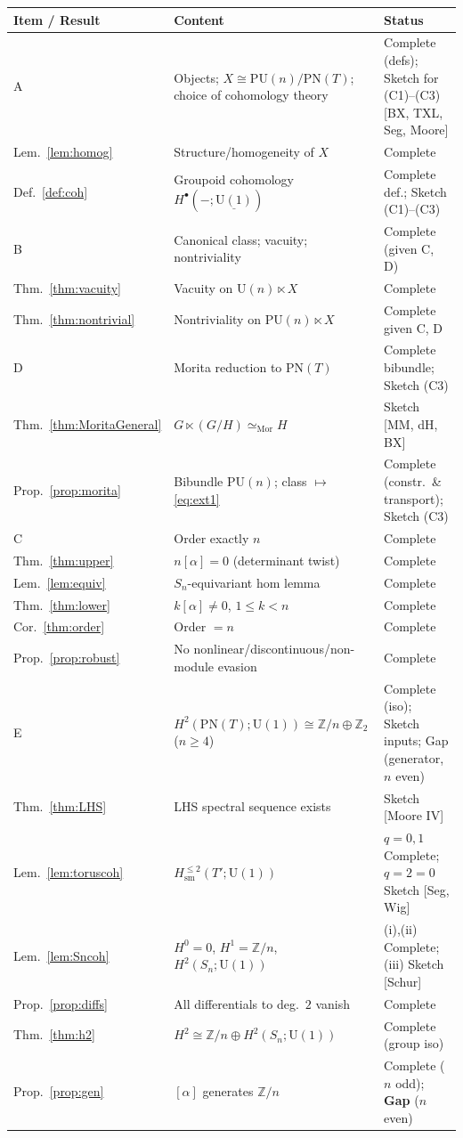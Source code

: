 \documentclass[11pt]{article}
\theoremstyle{definition}
\newcommand{\U}{\mathrm{U}}
\newcommand{\PU}{\mathrm{PU}}
\newcommand{\PN}{\mathrm{PN}}
\newcommand{\Z}{\mathbb{Z}}
\newcommand{\Tp}{T'}
\newcommand{\sm}{\mathrm{sm}}
\begin{document}
\begin{center}
\small
\begin{tabular}{@{}p{}p{}p{}@{}}
\toprule
\textbf{Item / Result} & \textbf{Content} & \textbf{Status} \\
\midrule
A & Objects; $X\cong\PU(n)/\PN(T)$; choice of cohomology theory & Complete (defs);
Sketch for (C1)--(C3) [BX, TXL, Seg, Moore] \\
\;Lem.~\ref{lem:homog} & Structure/homogeneity of $X$ & Complete \\
\;Def.~\ref{def:coh} & Groupoid cohomology $H^\bullet(-;\underline{\U(1)})$ & Complete def.;
Sketch (C1)--(C3) \\
\midrule
B & Canonical class; vacuity; nontriviality & Complete (given C, D) \\
\;Thm.~\ref{thm:vacuity} & Vacuity on $\U(n)\ltimes X$ & Complete \\
\;Thm.~\ref{thm:nontrivial} & Nontriviality on $\PU(n)\ltimes X$ & Complete given C, D \\
\midrule
D & Morita reduction to $\PN(T)$ & Complete bibundle; Sketch (C3) \\
\;Thm.~\ref{thm:MoritaGeneral} & $G\ltimes(G/H)\simeq_{\mathrm{Mor}}H$ & Sketch [MM, dH,
BX] \\
\;Prop.~\ref{prop:morita} & Bibundle $\PU(n)$; class $\mapsto$ \eqref{eq:ext1} & Complete
(constr.\ \& transport); Sketch (C3) \\
\midrule
C & Order exactly $n$ & Complete \\
\;Thm.~\ref{thm:upper} & $n[\alpha]=0$ (determinant twist) & Complete \\
\;Lem.~\ref{lem:equiv} & $S_n$-equivariant hom lemma & Complete \\
\;Thm.~\ref{thm:lower} & $k[\alpha]\neq0$, $1\le k<n$ & Complete \\
\;Cor.~\ref{thm:order} & Order $=n$ & Complete \\
\;Prop.~\ref{prop:robust} & No nonlinear/discontinuous/non-module evasion & Complete \\
\midrule
E & $H^2(\PN(T);\U(1))\cong\Z/n\oplus\Z_2$ ($n\ge4$) & Complete (iso); Sketch inputs;
Gap (generator, $n$ even) \\
\;Thm.~\ref{thm:LHS} & LHS spectral sequence exists & Sketch [Moore IV] \\
\;Lem.~\ref{lem:toruscoh} & $H^{\le2}_{\sm}(\Tp;\U(1))$ & $q{=}0,1$ Complete; $q{=}2{=}0$
Sketch [Seg, Wig] \\
\;Lem.~\ref{lem:Sncoh} & $H^0{=}0$, $H^1{=}\Z/n$, $H^2(S_n;\U(1))$ & (i),(ii) Complete;
(iii) Sketch [Schur] \\
\;Prop.~\ref{prop:diffs} & All differentials to deg.\ $2$ vanish & Complete \\
\;Thm.~\ref{thm:h2} & $H^2\cong\Z/n\oplus H^2(S_n;\U(1))$ & Complete (group iso) \\
\;Prop.~\ref{prop:gen} & $[\alpha]$ generates $\Z/n$ & Complete ($n$ odd); \textbf{Gap}
($n$ even) \\
\bottomrule
\end{tabular}
\end{center}
\end{document}
